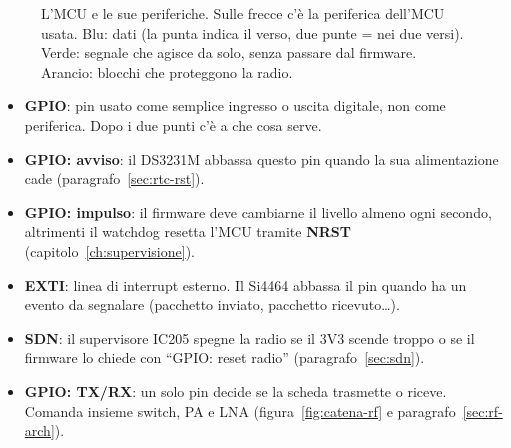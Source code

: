 \begin{figure}[htbp]
\caption{L'MCU e le sue periferiche. Sulle frecce c'è la periferica dell'MCU usata. Blu: dati (la punta indica il verso, due punte = nei due versi). Verde: segnale che agisce da solo, senza passare dal firmware. Arancio: blocchi che proteggono la radio.}
\label{fig:blocchi}
\end{figure}

\begin{nota}
\begin{itemize}
\item \textbf{GPIO}: pin usato come semplice ingresso o uscita digitale, non come periferica. Dopo i due punti c'è a che cosa serve.
\item \textbf{GPIO: avviso}: il DS3231M abbassa questo pin quando la sua alimentazione cade (paragrafo~\ref{sec:rtc-rst}).
\item \textbf{GPIO: impulso}: il firmware deve cambiarne il livello almeno ogni secondo, altrimenti il watchdog resetta l'MCU tramite \textbf{NRST} (capitolo~\ref{ch:supervisione}).
\item \textbf{EXTI}: linea di interrupt esterno. Il Si4464 abbassa il pin quando ha un evento da segnalare (pacchetto inviato, pacchetto ricevuto\ldots).
\item \textbf{SDN}: il supervisore IC205 spegne la radio se il 3V3 scende troppo o se il firmware lo chiede con \enquote{GPIO: reset radio} (paragrafo~\ref{sec:sdn}).
\item \textbf{GPIO: TX/RX}: un solo pin decide se la scheda trasmette o riceve. Comanda insieme switch, PA e LNA (figura~\ref{fig:catena-rf} e paragrafo~\ref{sec:rf-arch}).
\end{itemize}
\end{nota}

